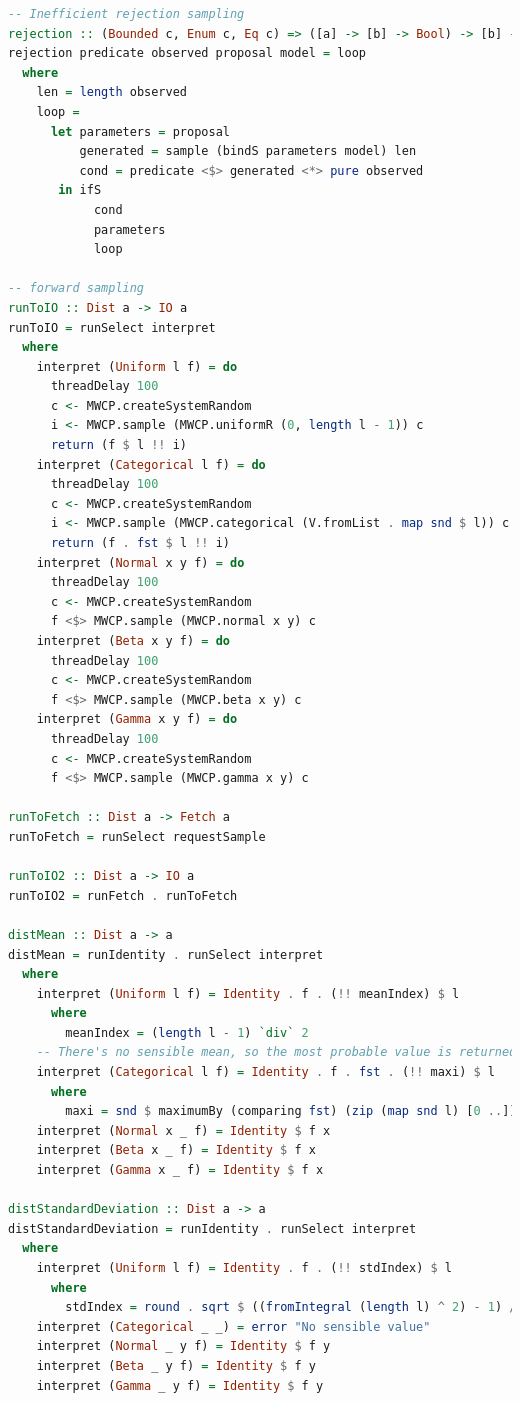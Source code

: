 \documentclass[
  oneside,
  11pt, a4paper,
  footinclude=true,
  headinclude=true,
  cleardoublepage=empty
]{scrbook}
\theoremstyle{definition}
\theoremstyle{definition}
\begin{document}
\begin{lstlisting}[language=Haskell, caption={Selective probabilistic programming library},captionpos=b]
-- Inefficient rejection sampling
rejection :: (Bounded c, Enum c, Eq c) => ([a] -> [b] -> Bool) -> [b] -> Dist c -> (c -> Dist a) -> Dist c
rejection predicate observed proposal model = loop
  where
    len = length observed
    loop =
      let parameters = proposal
          generated = sample (bindS parameters model) len
          cond = predicate <$> generated <*> pure observed
       in ifS
            cond
            parameters
            loop

-- forward sampling
runToIO :: Dist a -> IO a
runToIO = runSelect interpret
  where
    interpret (Uniform l f) = do
      threadDelay 100
      c <- MWCP.createSystemRandom
      i <- MWCP.sample (MWCP.uniformR (0, length l - 1)) c
      return (f $ l !! i)
    interpret (Categorical l f) = do
      threadDelay 100
      c <- MWCP.createSystemRandom
      i <- MWCP.sample (MWCP.categorical (V.fromList . map snd $ l)) c
      return (f . fst $ l !! i)
    interpret (Normal x y f) = do
      threadDelay 100
      c <- MWCP.createSystemRandom
      f <$> MWCP.sample (MWCP.normal x y) c
    interpret (Beta x y f) = do
      threadDelay 100
      c <- MWCP.createSystemRandom
      f <$> MWCP.sample (MWCP.beta x y) c
    interpret (Gamma x y f) = do
      threadDelay 100
      c <- MWCP.createSystemRandom
      f <$> MWCP.sample (MWCP.gamma x y) c

runToFetch :: Dist a -> Fetch a
runToFetch = runSelect requestSample

runToIO2 :: Dist a -> IO a
runToIO2 = runFetch . runToFetch

distMean :: Dist a -> a
distMean = runIdentity . runSelect interpret
  where
    interpret (Uniform l f) = Identity . f . (!! meanIndex) $ l
      where
        meanIndex = (length l - 1) `div` 2
    -- There's no sensible mean, so the most probable value is returned
    interpret (Categorical l f) = Identity . f . fst . (!! maxi) $ l
      where
        maxi = snd $ maximumBy (comparing fst) (zip (map snd l) [0 ..])
    interpret (Normal x _ f) = Identity $ f x
    interpret (Beta x _ f) = Identity $ f x
    interpret (Gamma x _ f) = Identity $ f x

distStandardDeviation :: Dist a -> a
distStandardDeviation = runIdentity . runSelect interpret
  where
    interpret (Uniform l f) = Identity . f . (!! stdIndex) $ l
      where
        stdIndex = round . sqrt $ ((fromIntegral (length l) ^ 2) - 1) / 12
    interpret (Categorical _ _) = error "No sensible value"
    interpret (Normal _ y f) = Identity $ f y
    interpret (Beta _ y f) = Identity $ f y
    interpret (Gamma _ y f) = Identity $ f y


\end{lstlisting}
\end{document}
